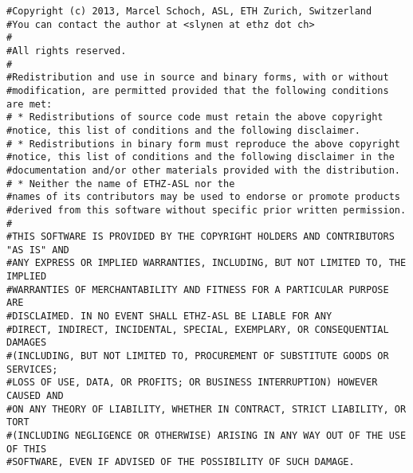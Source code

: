 \begin{verbatim}
#Copyright (c) 2013, Marcel Schoch, ASL, ETH Zurich, Switzerland
#You can contact the author at <slynen at ethz dot ch>
#
#All rights reserved.
#
#Redistribution and use in source and binary forms, with or without
#modification, are permitted provided that the following conditions are met:
# * Redistributions of source code must retain the above copyright
#notice, this list of conditions and the following disclaimer.
# * Redistributions in binary form must reproduce the above copyright
#notice, this list of conditions and the following disclaimer in the
#documentation and/or other materials provided with the distribution.
# * Neither the name of ETHZ-ASL nor the
#names of its contributors may be used to endorse or promote products
#derived from this software without specific prior written permission.
#
#THIS SOFTWARE IS PROVIDED BY THE COPYRIGHT HOLDERS AND CONTRIBUTORS "AS IS" AND
#ANY EXPRESS OR IMPLIED WARRANTIES, INCLUDING, BUT NOT LIMITED TO, THE IMPLIED
#WARRANTIES OF MERCHANTABILITY AND FITNESS FOR A PARTICULAR PURPOSE ARE
#DISCLAIMED. IN NO EVENT SHALL ETHZ-ASL BE LIABLE FOR ANY
#DIRECT, INDIRECT, INCIDENTAL, SPECIAL, EXEMPLARY, OR CONSEQUENTIAL DAMAGES
#(INCLUDING, BUT NOT LIMITED TO, PROCUREMENT OF SUBSTITUTE GOODS OR SERVICES;
#LOSS OF USE, DATA, OR PROFITS; OR BUSINESS INTERRUPTION) HOWEVER CAUSED AND
#ON ANY THEORY OF LIABILITY, WHETHER IN CONTRACT, STRICT LIABILITY, OR TORT
#(INCLUDING NEGLIGENCE OR OTHERWISE) ARISING IN ANY WAY OUT OF THE USE OF THIS
#SOFTWARE, EVEN IF ADVISED OF THE POSSIBILITY OF SUCH DAMAGE.
\end{verbatim}
